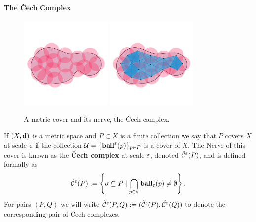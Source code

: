 
\paragraph{The \v Cech Complex}

\begin{figure}[htbp]
  \centering
  \includegraphics[trim=0 300 0 500, clip, width=0.4\textwidth]{figures/cech/cover.pdf}
  \includegraphics[trim=0 300 0 500, clip, width=0.4\textwidth]{figures/cech/full.pdf}
  \caption{A metric cover and its nerve, the \v Cech complex.}\label{fig:nerves}
\end{figure}

If $(X,\mathbf{d})$ is a metric space and $P\subset X$ is a finite collection we say that $P$ covers $X$ at scale $\varepsilon$ if the collection $\mathcal{U} = \{\mathbf{ball}^\varepsilon(p)\}_{p\in P}$ is a cover of $X$.
The Nerve of this cover is known as the \textbf{\v Cech complex} at scale $\varepsilon$, denoted $\check{\mathcal{C}}^\varepsilon(P)$, and is defined formally as
\[ \check{\mathcal{C}}^\varepsilon(P) := \left\{\sigma \subseteq P\mid \bigcap_{p\in \sigma}\mathbf{ball}_\varepsilon(p)\neq \emptyset \right\}. \]
For pairs $(P, Q)$ we will write $\check{\mathcal{C}}^\varepsilon(P,Q) := (\check{\mathcal{C}}^\varepsilon(P), \check{\mathcal{C}}^\varepsilon(Q))$ to denote the corresponding pair of \v Cech complexes.

